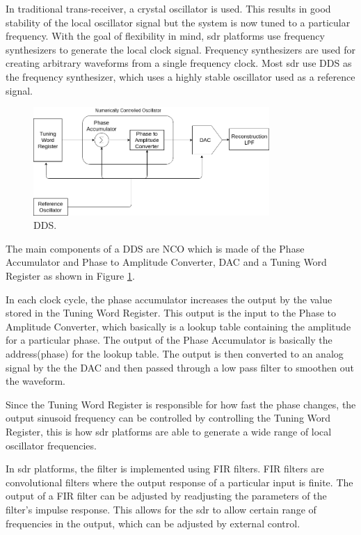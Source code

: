 \begin{itemize}
In traditional trans-receiver, a crystal oscillator is used.
This results in good stability of the local oscillator signal but the system is now tuned to a particular frequency.
With the goal of flexibility in mind, \ac{sdr} platforms use frequency synthesizers to generate the local clock signal.
Frequency synthesizers are used for creating arbitrary waveforms from a single frequency clock.
Most \ac{sdr} use \ac{DDS} as the frequency synthesizer, which uses a highly stable oscillator used as a reference signal.



\begin{figure}[h!]
\centering
\label{dds}
\includegraphics[width=0.8\textwidth]{Figure/DDS.png}
\caption{\ac{DDS}.}
\end{figure}

The main components of a \ac{DDS} are \ac{NCO} which is made of the Phase Accumulator and Phase to Amplitude Converter, \ac{DAC} and a Tuning Word Register as shown in Figure \ref{dds}.

In each clock cycle, the phase accumulator increases the output by the value stored in the Tuning Word Register.
This output is the input to the Phase to Amplitude Converter, which basically is a lookup table containing the amplitude for a particular phase.
The output of the Phase Accumulator is basically the address(phase) for the lookup table.
The output is then converted to an analog signal by the the \ac{DAC} and then passed through a low pass filter to smoothen out the waveform.

Since the Tuning Word Register is responsible for how fast the phase changes, the output sinusoid frequency can be controlled by controlling the Tuning Word Register, this is how \ac{sdr} platforms are able to generate a wide range of local oscillator frequencies.

In \ac{sdr} platforms, the filter is implemented using \ac{FIR} filters.
\ac{FIR} filters are convolutional filters where the output response of a particular input is finite.
The output of a \ac{FIR} filter can be adjusted by readjusting the parameters of the filter's impulse response.
This allows for the \ac{sdr} to allow certain range of frequencies in the output, which can be adjusted by external control.


\end{itemize}
